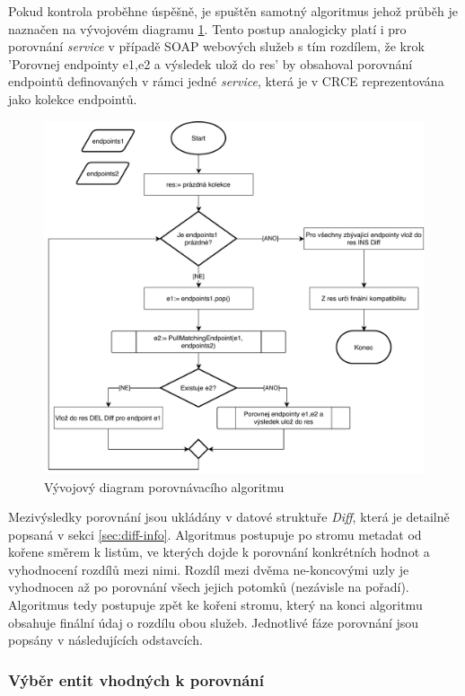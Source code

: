 \documentclass[czech,DP]{thesiskiv}
\begin{document}
Pokud kontrola proběhne úspěšně, je spuštěn samotný algoritmus jehož průběh je naznačen na vývojovém diagramu \ref{fig:apicomp-flow}. Tento postup analogicky platí i pro porovnání \textit{service} v případě SOAP webových služeb s tím rozdílem, že krok 'Porovnej endpointy e1,e2 a výsledek ulož do res' by obsahoval porovnání endpointů definovaných v rámci jedné \textit{service}, která je v CRCE reprezentována jako kolekce endpointů.

\begin{figure}[h]
	\centering
	\includegraphics[width=\linewidth]{apicomp-flow}
	\caption{Vývojový diagram porovnávacího algoritmu}
	\label{fig:apicomp-flow}
\end{figure}

Mezivýsledky porovnání jsou ukládány v datové struktuře \textit{Diff}, která je detailně popsaná v sekci \ref{sec:diff-info}. Algoritmus postupuje po stromu metadat od kořene směrem k listům, ve kterých dojde k porovnání konkrétních hodnot a vyhodnocení rozdílů mezi nimi. Rozdíl mezi dvěma ne-koncovými uzly je vyhodnocen až po porovnání všech jejich potomků (nezávisle na pořadí). Algoritmus tedy postupuje zpět ke kořeni stromu, který na konci algoritmu obsahuje finální údaj o rozdílu obou služeb. Jednotlivé fáze porovnání jsou popsány v následujících odstavcích.

\subsubsection{Výběr entit vhodných k porovnání}
\end{document}
